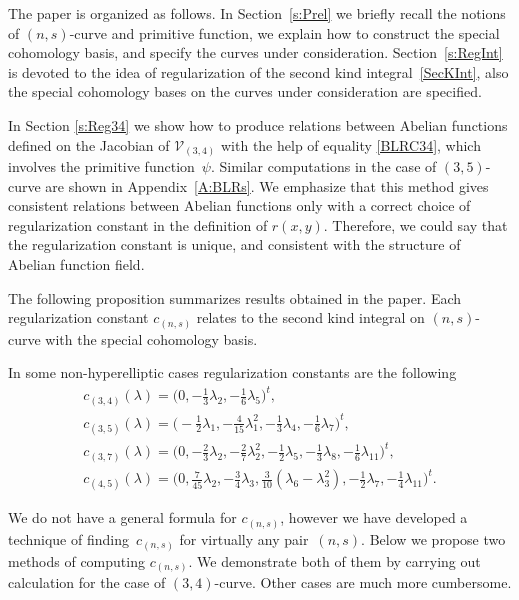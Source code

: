 The paper is organized as follows. In Section~\ref{s:Prel} we briefly recall the notions of $(n,s)$-curve and primitive function, we explain how to construct the special cohomology basis, and specify the curves under consideration. Section~\ref{s:RegInt} is devoted to the idea of regularization of the second kind integral~\eqref{SecKInt}, also the special cohomology bases on the curves under consideration are specified.

In Section \ref{s:Reg34} we show how to produce relations between Abelian functions defined on the Jacobian of $\mathcal{V}_{(3,4)}$ with the help of equality \eqref{BLRC34}, which involves the primitive function~$\psi$. Si\-mi\-lar computations in the case of $(3,5)$-curve are shown in Appendix~\ref{A:BLRs}. We emphasize that this method gives consistent relations between Abelian functions only with a correct choice of regularization constant in the definition of $r(x,y)$. Therefore, we could say that the regularization constant is unique, and consistent with the structure of Abelian function field.

The following proposition summarizes results obtained in the paper. Each regularization constant $c_{(n,s)}$ relates to the second kind integral on $(n,s)$-curve with the special cohomology basis.
\begin{Proposition}
In some non-hyperelliptic cases regularization constants are the following
 \begin{gather*}
 c_{(3,4)}(\lambda) = \big(0, -\tfrac{1}{3}\lambda_2, {-}\tfrac{1}{6}\lambda_5 \big)^t,\\
 c_{(3,5)}(\lambda) = \big({-}\tfrac{1}{2}\lambda_1, -\tfrac{4}{15}\lambda_1^2, -\tfrac{1}{3}\lambda_4, {-}\tfrac{1}{6}\lambda_7 \big)^t,\\
 c_{(3,7)}(\lambda) = \big(0,{-}\tfrac{2}{3}\lambda_2,{-}\tfrac{2}{7}\lambda_2^2,{-}\tfrac{1}{2}\lambda_5,
 {-}\tfrac{1}{3}\lambda_8,{-}\tfrac{1}{6}\lambda_{11}\big)^t,\\
 c_{(4,5)}(\lambda) = \big(0, \tfrac{7}{45}\lambda_2, -\tfrac{3}{4}\lambda_3, \tfrac{3}{10}(\lambda_6-\lambda_3^2),
 -\tfrac{1}{2}\lambda_7, {-}\tfrac{1}{4}\lambda_{11} \big)^t.
\end{gather*}
\end{Proposition}
We do not have a general formula for $c_{(n,s)}$, however we have developed a technique of finding~$c_{(n,s)}$ for virtually any pair~$(n,s)$. Below we propose two methods of computing $c_{(n,s)}$. We demonstrate both of them by carrying out calculation for the case of $(3,4)$-curve. Other cases are much more cumbersome.

